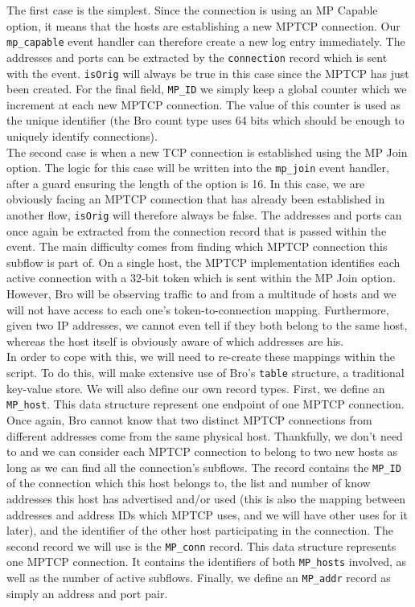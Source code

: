 The first case is the simplest. Since the connection is using an MP Capable option, it means that the hosts are establishing a new MPTCP connection. Our \texttt{mp\_capable} event handler can therefore create a new log entry immediately. The addresses and ports can be extracted by the \texttt{connection} record which is sent with the event. \texttt{isOrig} will always be true in this case since the MPTCP has just been created. For the final field, \texttt{MP\_ID} we simply keep a global counter which we increment at each new MPTCP connection. The value of this counter is used as the unique identifier (the Bro count type uses 64 bits which should be enough to uniquely identify connections). \\

The second case is when a new TCP connection is established using the MP Join option. The logic for this case will be written into the \texttt{mp\_join} event handler, after a guard ensuring the length of the option is 16. In this case, we are obviously facing an MPTCP connection that has already been established in another flow, \texttt{isOrig} will therefore always be false. The addresses and ports can once again be extracted from the connection record that is passed within the event. The main difficulty comes from finding which  MPTCP connection this subflow is part of. On a single host, the MPTCP implementation identifies each active connection with a 32-bit token which is sent within the MP Join option. However, Bro will be observing traffic to and from a multitude of hosts and we will not have access to each one's token-to-connection mapping. Furthermore, given two IP addresses, we cannot even tell if they both belong to the same host, whereas the host itself is obviously aware of which addresses are his. \\

In order to cope with this, we will need to re-create these mappings within the script. To do this, will make extensive use of Bro's \texttt{table} structure, a traditional key-value store. We will also define our own record types. First, we define an \texttt{MP\_host}. This data structure represent one endpoint of one MPTCP connection. Once again, Bro cannot know that two distinct MPTCP connections from different addresses come from the same physical host. Thankfully, we don't need to and we can consider each MPTCP connection to belong to two new hosts as long as we can find all the connection's subflows. The record contains the \texttt{MP\_ID} of the connection which this host belongs to, the list and number of know addresses this host has advertised and/or used (this is also the mapping between addresses and address IDs which MPTCP uses, and we will have other uses for it later), and the identifier of the other host participating in the connection. The second record we will use is the \texttt{MP\_conn} record. This data structure represents one MPTCP connection. It contains the identifiers of both \texttt{MP\_hosts} involved, as well as the number of active subflows. Finally, we define an \texttt{MP\_addr} record as simply an address and port pair. \\

